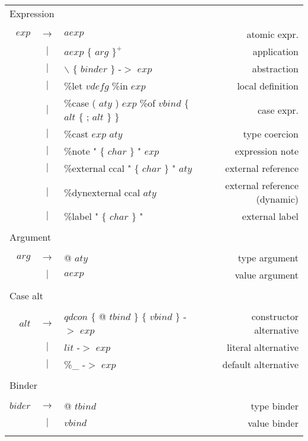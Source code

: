 \documentclass{article}
\begin{document}
\begin{footnotesize}
\begin{longtable}{ r c l r }
\multicolumn{4}{l}{Expression}			 \\
\\[0.01in]
$exp$		& $ \rightarrow $	& $aexp$										& atomic expr.		\\
		& $ | $			& $aexp$ $\{$ $arg$ $\}^{+}$ 								& application		\\
		& $ | $			& $\backslash$ $\{$ $binder$ $\}$ -$>$ $exp$						& abstraction		\\
		& $ | $			& \%let	$vdefg$ \%in $exp$								& local definition	\\
		& $ | $			& \%case ( $aty$ ) $exp$ \%of $vbind$ $\{$ $alt$ $\{$ ; $alt$ $\}$ $\}$			& case expr.		\\
		& $ | $			& \%cast $exp$ $aty$									& type coercion		\\
		& $ | $			& \%note "  $\{$ $char$ $\}$ " $exp$							& expression note	\\
		& $ | $			& \%external ccal " $\{$ $char$ $\}$ " $aty$						& external reference	\\
		& $ | $			& \%dynexternal ccal $aty$								& external reference (dynamic)	\\
		& $ | $			& \%label " $\{$ $char$ $\}$ "								& external label	\\
\\[0.01in]

\multicolumn{4}{l}{Argument}			 \\
\\[0.01in]
$arg$		& $ \rightarrow $	& @ $aty$										& type argument		\\
		& $ | $			& $aexp$										& value argument	\\
\\[0.01in]

\multicolumn{4}{l}{Case alt}			 \\
\\[0.01in]
$alt$		& $ \rightarrow $	& $qdcon$ $\{$ @ $tbind$ $\}$ $\{$ $vbind$ $\}$ -$>$ $exp$				& constructor alternative \\
		& $ | $			& $lit$ -$>$ $exp$									& literal alternative 	\\
		& $ | $			& \%\_ -$>$ $exp$									& default alternative	\\
\\[0.01in]

\multicolumn{4}{l}{Binder}			 \\
\\[0.01in]
$bider$		& $ \rightarrow $	& @ $tbind$										& type binder		\\
		& $ | $			& $vbind$										& value binder		\\
\\[0.01in]


\end{longtable}
\end{footnotesize}
\end{document}
